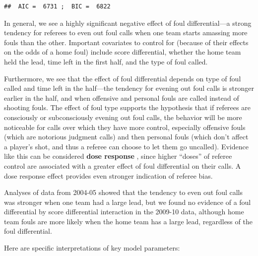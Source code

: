\documentclass[
]{krantz}
\begin{document}
\begin{verbatim}
##  AIC =  6731 ;  BIC =  6822
\end{verbatim}

In general, we see a highly significant negative effect of foul differential---a strong tendency for referees to even out foul calls when one team starts amassing more fouls than the other. Important covariates to control for (because of their effects on the odds of a home foul) include score differential, whether the home team held the lead, time left in the first half, and the type of foul called.

Furthermore, we see that the effect of foul differential depends on type of foul called and time left in the half---the tendency for evening out foul calls is stronger earlier in the half, and when offensive and personal fouls are called instead of shooting fouls. The effect of foul type supports the hypothesis that if referees are consciously or subconsciously evening out foul calls, the behavior will be more noticeable for calls over which they have more control, especially offensive fouls (which are notorious judgment calls) and then personal fouls (which don't affect a player's shot, and thus a referee can choose to let them go uncalled). Evidence like this can be considered \textbf{dose response} , since higher ``doses'' of referee control are associated with a greater effect of foul differential on their calls. A dose response effect provides even stronger indication of referee bias.

Analyses of data from 2004-05 \citep{Noecker2012} showed that the tendency to even out foul calls was stronger when one team had a large lead, but we found no evidence of a foul differential by score differential interaction in the 2009-10 data, although home team fouls are more likely when the home team has a large lead, regardless of the foul differential.

Here are specific interpretations of key model parameters:
\end{document}
